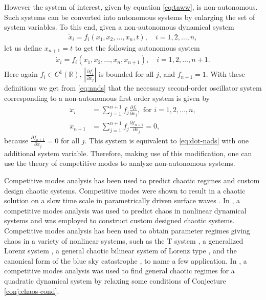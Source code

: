 However the system of interest, given by equation \eqref{eq:taww}, is 
non-autonomous. Such systems can be converted into autonomous systems by
enlarging the set of system variables. To this end, given a non-autonomous 
dynamical system
\begin{align*}
\dot x_i = f_i(x_1,x_2, \ldots, x_n,t), \quad i =1,2,\ldots,n,
\end{align*}
let us define $x_{n+1} = t$ to get the following autonomous system
\begin{align} \label{eq:nnds}
\dot x_i = f_i(x_1,x_2, \ldots, x_n,x_{n+1}), \quad i =1,2,\ldots,n+1.
\end{align}
Here again $f_i \in C^1(\mathbb{R})$, $\left|\frac{\partial f_i}{\partial x_j} \right|$ 
is bounded for all $j$, and $f_{n+1} = 1$. With these definitions we get from 
\eqref{eq:nnds} that the necessary second-order oscillator system corresponding to a non-autonomous first order system is given by
\begin{align*}
\ddot x_i &= \sum_{j=1}^{n+1} f_j \frac{\partial f_i}{\partial x_j}, \text{ for 
} i = 1,2,\ldots,n,\\
\ddot x_{n+1} &= \sum_{j=1}^{n+1} f_j \frac{\partial f_{n+1}}{\partial x_j} =0,
\end{align*}
because $\frac{\partial f_{n+1}}{\partial x_j} =0$ for all $j$. This system is 
equivalent to \eqref{eq:dot-nads} with one additional system variable. Therefore, making use of this modification,
one can use the theory of competitive modes to analyze non-autonomous systems. 

Competitive modes analysis has been used to predict chaotic regimes and custom design chaotic systems. Competitive modes were shown to result in a chaotic solution on a slow time scale in parametrically driven surface waves \cite{CG85}. In \cite{YYED06}, a competitive modes analysis was used to predict chaos in nonlinear dynamical systems and was employed to construct custom designed chaotic systems. Competitive modes analysis has been used to obtain parameter regimes giving chaos in a variety of nonlinear systems, such as the T system \cite{CG10}, a generalized Lorenz system \cite{VanGorder11}, a general chaotic bilinear system of Lorenz type \cite{CM7}, and the canonical form of the blue sky catastrophe \cite{bsc}, to name a few application. In \cite{CG12}, a competitive modes analysis was used to find general chaotic regimes for a quadratic dynamical system by relaxing some conditions of Conjecture \ref{conj:chaos-cond}.

